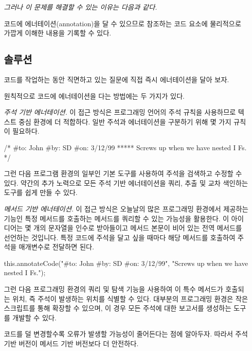 \documentclass[a4paper,10pt,twoside]{book}
\begin{document}
\emph{그러나 이 문제를 해결할 수 있는 이유는 다음과 같다.}

\begin{bulletlist}
\item 코드에 에너테이션(annotation)을 달 수 있으므로 참조하는 코드 요소에 물리적으로 가깝게 이해한 내용을 기록할 수 있다.
\end{bulletlist}

\subsection*{솔루션}

코드를 작업하는 동안 직면하고 있는 질문에 직접 즉시 에너테이션을 달아 보자. 

원칙적으로 코드에 에너테이션을 다는 방법에는 두 가지가 있다.

\begin{bulletlist}
\item \emph{주석 기반 에너테이션.}
이 접근 방식은 프로그래밍 언어의 주석 규칙을 사용하므로 텍스트 중심 환경에 더 적합하다. 일반 주석과 에너테이션을 구분하기 위해 몇 가지 규칙이 필요하다.

\begin{code}
/*  #to: John #by: SD #on: 3/12/99 *****
    Screws up when we have nested I Fs. */
\end{code}
그런 다음 프로그램 환경의 일부인 기본 도구를 사용하여 주석을 검색하고 수정할 수 있다. 약간의 추가 노력으로 모든 주석 기반 에너테이션을 쿼리, 추출 및 교차 색인하는 도구를 쉽게 만들 수 있다.

\item \emph{메서드 기반 에너테이션.}
이 접근 방식은 오늘날의 많은 프로그래밍 환경에서 제공하는 기능인 특정 메서드를 호출하는 메서드를 쿼리할 수 있는 가능성을 활용한다. 이 아이디어는 몇 개의 문자열을 인수로 받아들이고 메서드 본문이 비어 있는 전역 메서드를 선언하는 것입니다. 특정 코드에 주석을 달고 싶을 때마다 해당 메서드를 호출하여 주석을 매개변수로 전달하면 된다.

\begin{code}
this.annotateCode("#to: John #by: SD #on: 3/12/99",
    "Screws up when we have nested I Fs.");
\end{code}
그런 다음 프로그래밍 환경의 쿼리 및 탐색 기능을 사용하여 이 특수 메서드가 호출되는 위치, 즉 주석이 발생하는 위치를 식별할 수 있다. 대부분의 프로그래밍 환경은 작은 스크립트를 통해 확장할 수 있으며, 이 경우 모든 주석에 대한 보고서를 생성하는 도구를 개발할 수 있다.

코드를 덜 변경할수록 오류가 발생할 가능성이 줄어든다는 점에 알아두자. 따라서 주석 기반 버전이 메서드 기반 버전보다 더 안전하다.
\end{bulletlist}
\end{document}
